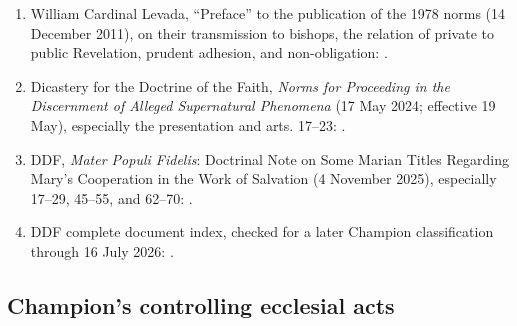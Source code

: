 \begin{enumerate}
  \item William Cardinal Levada, “Preface” to the publication of the 1978 norms (14 December 2011), on their transmission to bishops, the relation of private to public Revelation, prudent adhesion, and non-obligation: .
  \item Dicastery for the Doctrine of the Faith, \emph{Norms for Proceeding in the Discernment of Alleged Supernatural Phenomena} (17 May 2024; effective 19 May), especially the presentation and arts. 17--23: .
  \item DDF, \emph{Mater Populi Fidelis}: Doctrinal Note on Some Marian Titles Regarding Mary's Cooperation in the Work of Salvation (4 November 2025), especially 17--29, 45--55, and 62--70: .
  \item DDF complete document index, checked for a later Champion classification through 16 July 2026: .
\end{enumerate}

\subsection{Champion's controlling ecclesial acts}

